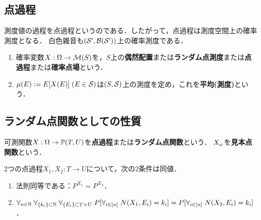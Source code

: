 \documentclass[uplatex,dvipdfmx]{jsreport}
\begin{document}
\subsection{点過程}

\begin{tcolorbox}[colframe=ForestGreen, colback=ForestGreen!10!white,breakable,colbacktitle=ForestGreen!40!white,coltitle=black,fonttitle=\bfseries\sffamily,
title=]
    測度値の過程を点過程というのである．したがって，点過程は測度空間上の確率測度となる．
    白色雑音も$(\S',\B(\S'))$上の確率測度である．
\end{tcolorbox}

\begin{definition}\mbox{}
    \begin{enumerate}
        \item 確率変数$X:\Om\to\M(S)$を，$S$上の\textbf{偶然配置}または\textbf{ランダム点測度}または\textbf{点過程}または\textbf{確率点場}という．
        \item $\mu(E):=E[X(E)]\;(E\in\S)$は$(S,\S)$上の測度を定め，これを\textbf{平均(測度)}という．
    \end{enumerate}
\end{definition}

\subsection{ランダム点関数としての性質}

\begin{definition}
    可測関数$X:\Om\to \bP(T,U)$を\textbf{点過程}または\textbf{ランダム点関数}という．
    $X_\om$を\textbf{見本点関数}という．
\end{definition}

\begin{lemma}
    2つの点過程$X_1,X_2:T\to U$について，次の2条件は同値．
    \begin{enumerate}
        \item 法則同等である：$P^{X_1}=P^{X_2}$．
        \item $\forall_{n\in\N}\;\forall_{\{k_i\}\subset\N}\;\forall_{\{E_i\}\subset T\times U}\;P[\forall_{i\in[n]}\;N(X_1,E_i)=k_i]=P[\forall_{i\in[n]}\;N(X_2,E_i)=k_i]$．
    \end{enumerate}
\end{lemma}
\end{document}
